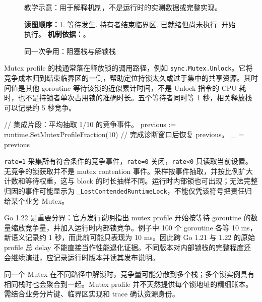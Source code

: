 \documentclass[UTF8,fontset=fandol,openany,11pt]{ctexbook}
\begin{document}
\begin{figure}[H]
\caption{同一次争用：阻塞栈与解锁栈}\label{fig:07-attribution}
\begin{minipage}{0.96\linewidth}\footnotesize 教学示意：用于解释机制，不是运行时的实测数据或完整实现。

\textbf{读图顺序：}1. 等待发生. 持有者结束临界区. 已就绪但尚未执行. 开始执行。
\textbf{机制依据：}\cite{tools-pprof}\cite{tools-trace-doc}。
\end{minipage}
\end{figure}
Mutex profile 的栈通常落在释放锁的调用路径，例如 \texttt{sync.\allowbreak{}Mutex.\allowbreak{}Unlock}。它将竞争成本归到结束临界区的一侧，帮助定位持锁太久或过于集中的共享资源。其时间值是其他 goroutine 等待该锁的近似累计时间，不是 Unlock 指令的 CPU 耗时，也不是持锁者单次占用锁的准确时长。五个等待者同时等 1 秒，相关释放栈可以记录约 5 秒竞争。\cite{tools-pprof}

\begin{codeblock}
// 集成片段：平均抽取 1/10 的竞争事件。
previous := runtime.SetMutexProfileFraction(10)
// 完成诊断窗口后恢复 previous。
_ = previous
\end{codeblock}

\texttt{rate=1} 采集所有符合条件的竞争事件，\texttt{rate=0} 关闭，\texttt{rate<0} 只读取当前设置。无竞争的锁获取并不是 mutex contention 事件。采样按事件抽取，并按比例扩大计数和等待权重，这与 block 的时长抽样不同。运行时内部锁也可出现；无法完整归因的事件可能显示为 \texttt{\_\allowbreak{}LostConten\allowbreak{}dedRuntime\allowbreak{}Lock}，不能仅凭该符号把责任归给某个业务 Mutex。\cite{tools-mprof}

Go 1.22 是重要分界：官方发行说明指出 mutex profile 开始按等待 goroutine 的数量缩放竞争量，并加入运行时内部锁竞争。例子中 100 个 goroutine 各等 10 ms，新语义记录约 1 秒，而此前可能只表现为 10 ms。因此跨 Go 1.21 与 1.22 的原始 profile 总 delay 不能直接当作性能退化证据。不同版本对内部锁栈的完整程度还会继续演进，应记录运行时版本并读其发布说明。\cite{tools-go122}

同一个 Mutex 在不同路径中解锁时，竞争量可能分散到多个栈；多个锁实例具有相同栈时也会聚合到一起。Mutex profile 并不天然提供每个锁地址的精细账本。需结合业务分片键、临界区实现和 trace 确认资源身份。
\end{document}
